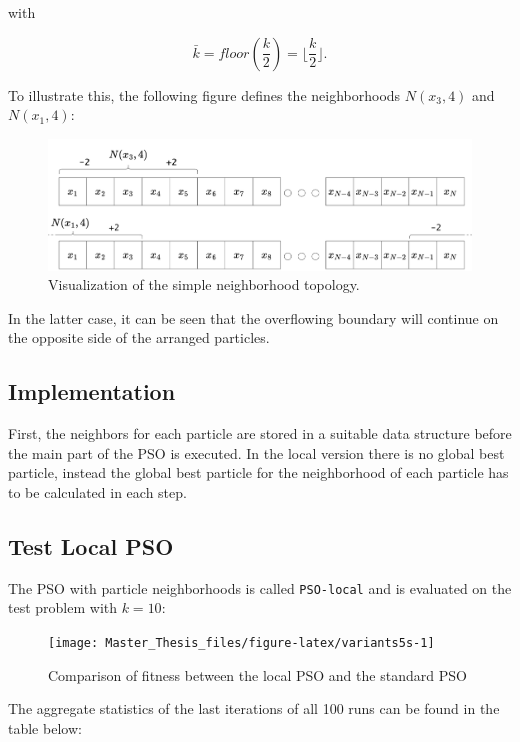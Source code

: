 \documentclass[
  oneside, a4paper, 12pt, openany]{book}
\theoremstyle{definition}
\theoremstyle{definition}
\theoremstyle{definition}
\theoremstyle{definition}
\theoremstyle{remark}
\begin{document}
with

\[
  \bar{k} = floor(\frac{k}{2}) = \lfloor \frac{k}{2} \rfloor.
\]

To illustrate this, the following figure defines the neighborhoods \(N(x_3, 4)\) and \(N(x_1, 4)\):

\begin{figure}
\centering
\includegraphics{img/PSO_local_chart4444.png}
\caption{Visualization of the simple neighborhood topology.}
\end{figure}

In the latter case, it can be seen that the overflowing boundary will continue on the opposite side of the arranged particles.

\hypertarget{implementation-1}{%
\subsection{Implementation}\label{implementation-1}}

First, the neighbors for each particle are stored in a suitable data structure before the main part of the PSO is executed. In the local version there is no global best particle, instead the global best particle for the neighborhood of each particle has to be calculated in each step.

\hypertarget{test-local-pso}{%
\subsection{Test Local PSO}\label{test-local-pso}}

The PSO with particle neighborhoods is called \texttt{PSO-local} and is evaluated on the test problem with \(k=10\):

\begin{figure}[H]
\texttt{[image: Master\_Thesis\_files/figure-latex/variants5s-1]} \caption{Comparison of fitness between the local PSO and the standard PSO}\label{fig:variants5s}
\end{figure}

The aggregate statistics of the last iterations of all 100 runs can be found in the table below:
\end{document}
